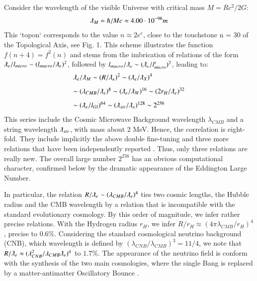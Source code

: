 \documentclass[twoside,draft]{article}
\begin{document}
\begin{sloppypar}
Consider the wavelength of the visible Universe with critical mass $M= Rc^2/2G$: $$\lambdabar_{M} = \hbar /Mc \approx 4.00 \cdot 10^{-96} m$$ This `topon` corresponds to the value $n \approx 2e^e$, close to the touchstone n = 30 of the Topological Axis, see Fig. 1. This scheme illustrates the function $f(n + 4) = f^{2}(n)$
and stems from the imbrication of relations of the form $\lambdabar_{e} /l_{micro} \sim (l_{macro} /\lambdabar_{e})^{2}$, followed by $ l_{macro} /\lambdabar_{e} \sim (\lambdabar_{e} /l^{\prime}_{micro} )^{2}$, leading to:
$$
\begin{array}{ll}
%
\displaystyle
\lambdabar_{e}/\lambdabar_{M} \sim (R/\lambdabar_{e})^{2} \sim (\lambdabar_{e}/ \lambdabar_{X})^{4}\\[+8pt]  %
\sim (\lambda_{CMB}/ \lambdabar_{e})^{8} \sim (\lambdabar_{e}/\lambdabar_{W})^{16} \sim (2r_{H} /\lambdabar_{e})^{32}\\[+8pt] %
\sim (\lambdabar_{e}/ l_{Gl} )^{64} \sim (\lambdabar_{str} /\lambdabar_{e} )^{128} \sim 2^{256}\\ %
\end{array}
$$
This series include the Cosmic Microwave Background wavelength $\lambda_{CMB}$ and a string wavelength $\lambdabar_{str}$, with mass about 2 MeV. Hence, the correlation is eight-fold. They include implicitly the above double fine-tuning and three  more relations that have been independently reported \cite{Sanchez1}. Thus, only three relations are really new. The overall large number $2^{256}$ has an obvious computational character, confirmed below by the dramatic appearance of the Eddington Large Number.

In particular, the relation $R/\lambdabar_{e} \sim (\lambda_{CMB} / \lambdabar_{e})^{4}$ ties two cosmic lengths, the Hubble radius and the CMB wavelength by a relation that is incompatible with the standard evolutionary cosmology. By this order of magnitude, we infer rather precise relations. With the Hydrogen radius $r_H$, we infer 
$ R/r_H \approx (4\pi \lambda_{CMB}/r_H)^{4}$, precise to $0.6\%$. 
Considering the standard cosmological neutrino background (CNB), which wavelength is defined by $(\lambda_{CNB} / \lambda_{CMB})^{3} = 11/4$, we note that $R/ \lambdabar_{e} \approx
( \lambda_{CNB}^{2} / \lambda_{CMB} \lambdabar_{e} )^{4}$ to $1.7\%$. The appearance of the neutrino field is conform with the synthesis of the two main cosmologies, where the single Bang is replaced by a matter-antimatter Oscillatory Bounce \cite{Sanchez2}.


\end{sloppypar}
\end{document}
